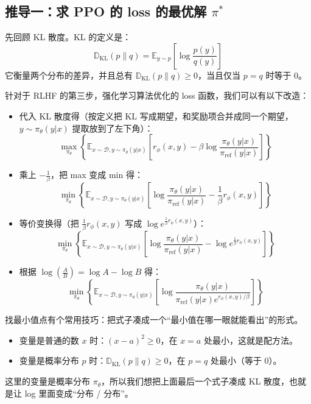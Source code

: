 \documentclass[UTF8,fontset=fandol]{ctexart}
\begin{document}
\subsection{推导一：求 PPO 的 loss 的最优解 \texorpdfstring{\(\pi^*\)}{pi*}}

先回顾 KL 散度。KL 的定义是：
\[
\mathbb{D}_{\mathrm{KL}}(p \parallel q) = \mathbb{E}_{y \sim p} \left[ \log \frac{p(y)}{q(y)} \right]
\]
它衡量两个分布的差异，并且总有 \(\mathbb{D}_{\mathrm{KL}}(p \parallel q) \ge 0\)，当且仅当 \(p = q\) 时等于 0。

针对于 RLHF 的第三步，强化学习算法优化的 loss 函数，我们可以有以下改造：
\begin{itemize}
\item 代入 KL 散度得（按定义把 KL 写成期望，和奖励项合并成同一个期望，\(y \sim \pi_\theta(y|x)\) 提取放到了左下角）：
\[
\max_{\pi_\theta} \left\{ \mathbb{E}_{x \sim \mathcal{D}, y \sim \pi_\theta(y|x)} \left[ r_\phi(x, y) - \beta \log \frac{\pi_\theta(y|x)}{\pi_{\text{ref}}(y|x)} \right] \right\}
\]

\item 乘上 \(-\frac{1}{\beta}\)，把 max 变成 min 得：
\[
\min_{\pi_\theta} \left\{ \mathbb{E}_{x \sim \mathcal{D}, y \sim \pi_\theta(y|x)} \left[ \log \frac{\pi_\theta(y|x)}{\pi_{\text{ref}}(y|x)} - \frac{1}{\beta} r_\phi(x, y) \right] \right\}
\]

\item 等价变换得（把 \(\frac{1}{\beta} r_\phi(x, y)\) 写成 \(\log e^{\frac{1}{\beta} r_\phi(x, y)}\)）：
\[
\min_{\pi_\theta} \left\{ \mathbb{E}_{x \sim \mathcal{D}, y \sim \pi_\theta(y|x)} \left[ \log \frac{\pi_\theta(y|x)}{\pi_{\text{ref}}(y|x)} - \log e^{\frac{1}{\beta} r_\phi(x, y)} \right] \right\}
\]

\item 根据 \(\log(\frac{A}{B}) = \log A - \log B\) 得：
\[
\min_{\pi_\theta} \left\{ \mathbb{E}_{x \sim \mathcal{D}, y \sim \pi_\theta(y|x)} \left[ \log \frac{\pi_\theta(y|x)}{\pi_{\text{ref}}(y|x) e^{r_\phi(x, y)/\beta}} \right] \right\}
\]
\end{itemize}

找最小值点有个常用技巧：把式子凑成一个“最小值在哪一眼就能看出”的形式。
\begin{itemize}
\item 变量是普通的数 \(x\) 时：\((x - a)^2 \ge 0\)，在 \(x = a\) 处最小，这就是配方法。
\item 变量是概率分布 \(p\) 时：\(\mathbb{D}_{\mathrm{KL}}(p \parallel q) \ge 0\)，在 \(p = q\) 处最小（等于 0）。
\end{itemize}
这里的变量是概率分布 \(\pi_\theta\)，所以我们想把上面最后一个式子凑成 KL 散度，也就是让 log 里面变成“分布 / 分布”。
\end{document}
